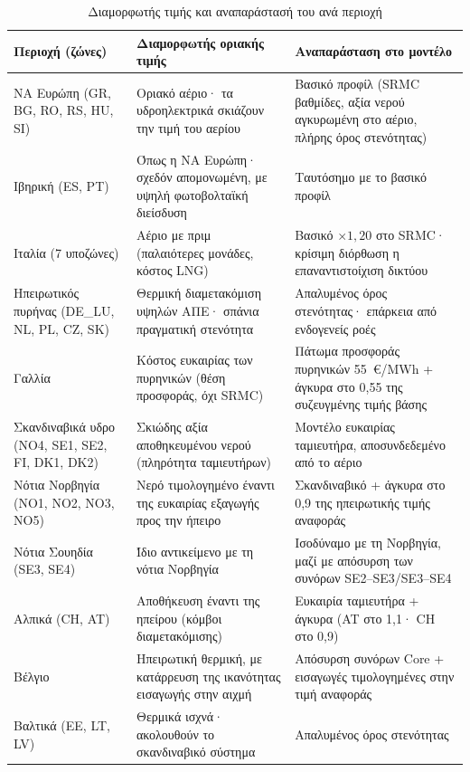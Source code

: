 \begin{table}[htbp]
\centering
\caption{Διαμορφωτής τιμής και αναπαράστασή του ανά περιοχή}
\label{tab:region-strategies}
\begin{tabular}{@{}p{3.2cm}p{4.6cm}p{5.2cm}@{}}
\toprule
\textbf{Περιοχή (ζώνες)} & \textbf{Διαμορφωτής οριακής τιμής} & \textbf{Αναπαράσταση στο μοντέλο} \\
\midrule
ΝΑ Ευρώπη \newline (GR, BG, RO, RS, HU, SI) & Οριακό αέριο· τα υδροηλεκτρικά σκιάζουν την τιμή του αερίου & Βασικό προφίλ (SRMC βαθμίδες, αξία νερού αγκυρωμένη στο αέριο, πλήρης όρος στενότητας) \\
Ιβηρική (ES, PT) & Όπως η ΝΑ Ευρώπη· σχεδόν απομονωμένη, με υψηλή φωτοβολταϊκή διείσδυση & Ταυτόσημο με το βασικό προφίλ \\
Ιταλία (7 υποζώνες) & Αέριο με πριμ (παλαιότερες μονάδες, κόστος LNG) & Βασικό $\times 1{,}20$ στο SRMC· κρίσιμη διόρθωση η επαναντιστοίχιση δικτύου \\
Ηπειρωτικός πυρήνας \newline (DE\_LU, NL, PL, CZ, SK) & Θερμική διαμετακόμιση υψηλών ΑΠΕ· σπάνια πραγματική στενότητα & Απαλυμένος όρος στενότητας· επάρκεια από ενδογενείς ροές \\
Γαλλία & Κόστος ευκαιρίας των πυρηνικών (θέση προσφοράς, όχι SRMC) & Πάτωμα προσφοράς πυρηνικών 55~€/MWh + άγκυρα στο 0,55 της συζευγμένης τιμής βάσης \\
Σκανδιναβικά υδρο \newline (NO4, SE1, SE2, FI, DK1, DK2) & Σκιώδης αξία αποθηκευμένου νερού (πληρότητα ταμιευτήρων) & Μοντέλο ευκαιρίας ταμιευτήρα, αποσυνδεδεμένο από το αέριο \\
Νότια Νορβηγία \newline (NO1, NO2, NO3, NO5) & Νερό τιμολογημένο έναντι της ευκαιρίας εξαγωγής προς την ήπειρο & Σκανδιναβικό + άγκυρα στο 0,9 της ηπειρωτικής τιμής αναφοράς \\
Νότια Σουηδία (SE3, SE4) & Ίδιο αντικείμενο με τη νότια Νορβηγία & Ισοδύναμο με τη Νορβηγία, μαζί με απόσυρση των συνόρων SE2--SE3/SE3--SE4 \\
Αλπικά (CH, AT) & Αποθήκευση έναντι της ηπείρου (κόμβοι διαμετακόμισης) & Ευκαιρία ταμιευτήρα + άγκυρα (AT στο 1,1· CH στο 0,9) \\
Βέλγιο & Ηπειρωτική θερμική, με κατάρρευση της ικανότητας εισαγωγής στην αιχμή & Απόσυρση συνόρων Core + εισαγωγές τιμολογημένες στην τιμή αναφοράς \\
Βαλτικά (EE, LT, LV) & Θερμικά ισχνά· ακολουθούν το σκανδιναβικό σύστημα & Απαλυμένος όρος στενότητας \\
\bottomrule
\end{tabular}
\end{table}

